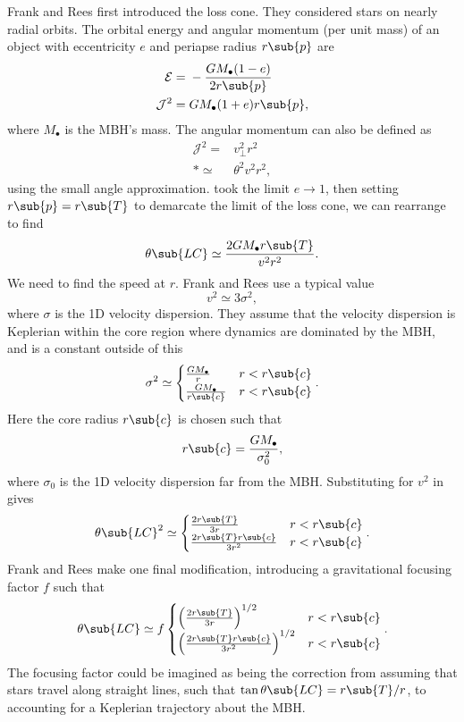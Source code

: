 Frank and Rees first introduced the loss cone. They considered stars on nearly radial orbits. The orbital energy and angular momentum (per unit mass) of an object with eccentricity $e$ and periapse radius $r\sub{p}$ are
\begin{align}
\mathcal{E} = {} & -\frac{GM_\bullet(1 - e)}{2r\sub{p}} \\
\mathcal{J}^2 = {} & GM_\bullet(1 + e)r\sub{p},
\end{align}
where $M_\bullet$ is the MBH's mass. The angular momentum can also be defined as
\begin{align}
\mathcal{J}^2 = {} & v_\perp^2r^2 \nonumber \\*
 \simeq {} & \theta^2v^2r^2,
\end{align}
using the small angle approximation. \citet{Frank1976} took the limit $e \rightarrow 1$, then setting $r\sub{p} = r\sub{T}$ to demarcate the limit of the loss cone, we can rearrange to find
\begin{equation}
\theta\sub{LC} \simeq \frac{2GM_\bullet r\sub{T}}{v^2r^2}.
\label{eq:LC-FR}
\end{equation}
We need to find the speed at $r$. Frank and Rees use a typical value
\begin{equation}
v^2 \simeq 3\sigma^2,
\end{equation}
where $\sigma$ is the 1D velocity dispersion. They assume that the velocity dispersion is Keplerian within the core region where dynamics are dominated by the MBH, and is a constant outside of this
\begin{equation}
\sigma^2 \simeq \begin{cases}
\frac{GM_\bullet}{r} & r < r\sub{c} \\
\frac{GM_\bullet}{r\sub{c}} & r < r\sub{c}
\end{cases}.
\end{equation}
Here the core radius $r\sub{c}$ is chosen such that
\begin{equation}
r\sub{c} = \frac{GM_\bullet}{\sigma_0^2},
\end{equation}
where $\sigma_0$ is the 1D velocity dispersion far from the MBH. Substituting for $v^2$ in  gives
\begin{align}
\theta\sub{LC}^2 \simeq \begin{cases}
\frac{2r\sub{T}}{3r} & r < r\sub{c} \\
\frac{2r\sub{T}r\sub{c}}{3r^2} & r < r\sub{c}
\end{cases}.
\label{eq:FR-LC}
\end{align}
Frank and Rees make one final modification, introducing a gravitational focusing factor $f$ such that
\begin{align}
\theta\sub{LC} \simeq f\begin{cases}
\left(\frac{2r\sub{T}}{3r}\right)^{1/2} & r < r\sub{c} \\
\left(\frac{2r\sub{T}r\sub{c}}{3r^2}\right)^{1/2} & r < r\sub{c}
\end{cases}.
\end{align}
The focusing factor could be imagined as being the correction from assuming that stars travel along straight lines, such that $\tan\theta\sub{LC} = r\sub{T}/r$, to accounting for a Keplerian trajectory about the MBH.

